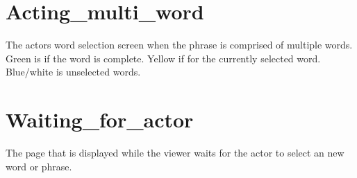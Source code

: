 \section{Acting\_multi\_word}
\begin{figure}[h!]
\end{figure}
The actors word selection screen when the phrase is comprised of multiple words. Green is if the word is complete. Yellow if for the currently selected word. Blue/white is unselected words.

\newpage


\section{Waiting\_for\_actor}
\begin{figure}[h!]
\end{figure}
The page that is displayed while the viewer waits for the actor to select an new word or phrase.

\newpage